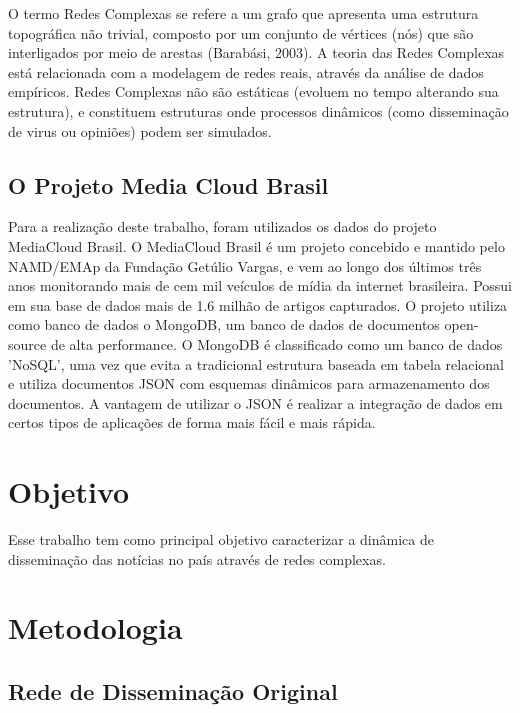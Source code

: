 \documentclass[a4paper,12pt]{article}
\begin{document}
O termo Redes Complexas se refere a um grafo que apresenta uma estrutura topográfica não trivial, composto por um conjunto
 de vértices (nós) que são interligados por meio de arestas (Barabási, 2003). A teoria das Redes Complexas  está relacionada com a modelagem de redes reais, através da 
 análise de dados empíricos. Redes Complexas não são estáticas (evoluem no tempo alterando sua estrutura), e 
 constituem estruturas onde processos dinâmicos (como disseminação de virus ou opiniões) podem ser simulados.
 
\subsection{O Projeto Media Cloud Brasil}

Para a realização deste trabalho, foram utilizados os dados do projeto MediaCloud Brasil. O MediaCloud Brasil é um projeto concebido e mantido pelo
NAMD/EMAp da Fundação Getúlio Vargas, e vem ao longo dos últimos três anos monitorando mais de cem mil veículos de mídia da internet brasileira. Possui em
sua base de dados mais de 1.6 milhão de artigos capturados.
O projeto utiliza como banco de dados o MongoDB, um banco de dados de documentos open-source de alta performance. O MongoDB é classificado como um banco de 
dados 'NoSQL', uma vez que evita a tradicional estrutura  baseada em tabela relacional e utiliza documentos JSON com esquemas dinâmicos para armazenamento 
dos documentos. A vantagem de utilizar o JSON é realizar a integração de dados em certos tipos de aplicações de forma mais fácil e mais rápida.
\section{Objetivo}

Esse trabalho tem como principal objetivo caracterizar a dinâmica de disseminação das notícias no país através de redes complexas.

\section{Metodologia}

\subsection{Rede de Disseminação Original}
\end{document}
